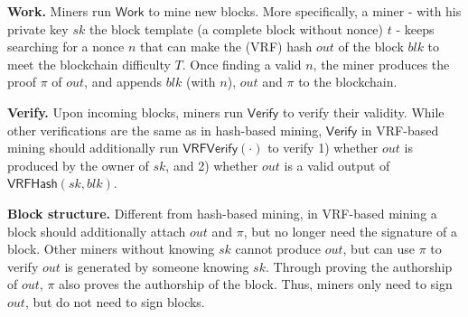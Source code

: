 \textbf{Work.}
Miners run $\mathsf{Work}$ to mine new blocks.
More specifically, a miner - with his private key $sk$ the block template (a complete block without nonce) $t$ - keeps searching for a nonce $n$ that can make the (VRF) hash $out$ of the block $blk$ to meet the blockchain difficulty $T$.
Once finding a valid $n$, the miner produces the proof $\pi$ of $out$, and appends $blk$ (with $n$), $out$ and $\pi$ to the blockchain.

\textbf{Verify.}
Upon incoming blocks, miners run $\mathsf{Verify}$ to verify their validity.
While other verifications are the same as in hash-based mining, $\mathsf{Verify}$ in VRF-based mining should additionally run $\mathsf{VRFVerify}(\cdot)$ to verify 1) whether $out$ is produced by the owner of $sk$, and 2) whether $out$ is a valid output of $\mathsf{VRFHash}(sk, blk)$.

\textbf{Block structure.}
Different from hash-based mining, in VRF-based mining a block should additionally attach $out$ and $\pi$, but no longer need the signature of a block.
Other miners without knowing $sk$ cannot produce $out$, but can use $\pi$ to verify $out$ is generated by someone knowing $sk$.
Through proving the authorship of $out$, $\pi$ also proves the authorship of the block.
Thus, miners only need to sign $out$, but do not need to sign blocks.